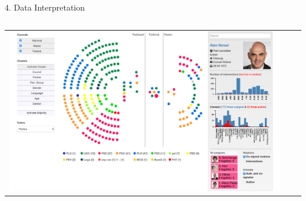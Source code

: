 \documentclass[final]{beamer}
\newlength{\onecolwid}
\newlength{\twocolwid}
\begin{document}
\begin{frame}[t]
\begin{columns}[t]
\begin{column}{\twocolwid}
\begin{columns}[t,totalwidth=\twocolwid]
\begin{column}{\onecolwid}
\begin{alertblock}{4. Data Interpretation}
\end{alertblock}


\end{column} %

\end{columns} %


\begin{center}
\begin{tabular}{ccc}
\includegraphics[width=1\linewidth]{img/capture_no_border}
\end{tabular}
\end{center}

%
%
%


\begin{columns}[t,totalwidth=\twocolwid] %

\begin{column}{\onecolwid} %


\end{column}
\end{columns}
\end{column}
\end{columns}
\end{frame}
\end{document}
